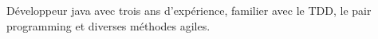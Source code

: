 
\begin{cvparagraph}

Développeur java avec trois ans d'expérience, familier avec le TDD, le pair programming et diverses méthodes agiles.

\end{cvparagraph}
